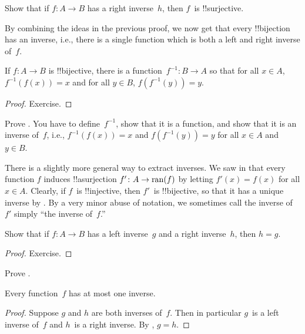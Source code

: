 \documentclass[../../../include/open-logic-section]{subfiles}
\begin{document}
\begin{prob}
Show that if $f\colon A \to B$ has a right inverse~$h$, then $f$~is
!!{surjective}.
\end{prob}

\begin{explain}
  By combining the ideas in the previous proof, we now get that every
  !!{bijection} has an inverse, i.e., there is a single function
  which is both a left and right inverse of~$f$.
\end{explain}

\begin{prop}
If $f\colon A \to B$ is !!{bijective}, there is a
function~$f^{-1}\colon B \to A$ so that for all $x \in A$,
$f^{-1}(f(x)) = x$ and for all $y \in B$, $f(f^{-1}(y)) = y$.
\end{prop}

\begin{proof}
Exercise.
\end{proof}

\begin{prob}
Prove . You have to
define~$f^{-1}$, show that it is a function, and show that it is an
inverse of~$f$, i.e., $f^{-1}(f(x)) = x$ and $f(f^{-1}(y)) = y$ for
all $x \in A$ and $y \in B$.
\end{prob}

\begin{explain}
There is a slightly more general way to extract inverses. We saw in
 that every function $f$ induces !!a{surjection} $f'
\colon A \to \mathrm{ran}(f)$ by letting $f'(x) = f(x)$ for all $x \in A$.
Clearly, if $f$~is !!{injective}, then $f'$~is !!{bijective}, so that
it has a unique inverse by . By a very
minor abuse of notation, we sometimes call the inverse of $f'$ simply
``the inverse of~$f$.''
\end{explain}

\begin{prop}%
  Show that if $f\colon A \to B$ has a left inverse~$g$ and a right
  inverse~$h$, then $h = g$.
\end{prop}

\begin{proof}
  Exercise.
\end{proof}

\begin{prob}
  Prove .
\end{prob}

\begin{prop}
Every function~$f$ has at most one inverse.
\end{prop}

\begin{proof}
  Suppose $g$ and $h$ are both inverses of~$f$. Then in particular
  $g$~is a left inverse of~$f$ and $h$~is a right inverse. By
  , $g = h$.
\end{proof}
\end{document}

